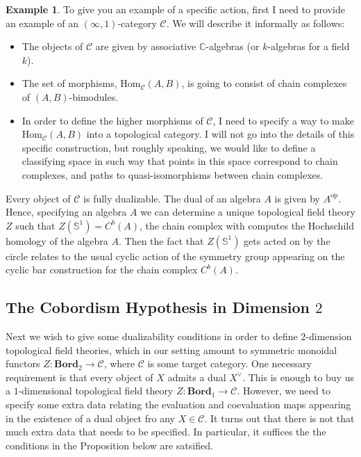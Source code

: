 \documentclass[a4paper,11pt]{article}
\newcommand{\Hom}{\mathrm{Hom}}
\newcommand{\ccal}{\mathcal{C}}
\theoremstyle{plain}
\theoremstyle{definition}
\newtheorem{ej}[thm]{Example}
\theoremstyle{remark}
\begin{document}
\begin{ej}
To give you an example of a specific action, first I need to provide an example of an $(\infty, 1)$-category $\ccal$. We will describe it informally as follows:
\begin{itemize}
    \item The objects of $\ccal$ are given by associative $\mathbb{C}$-algebras (or $k$-algebras for a field $k$). 
    \item The set of morphisms, $\Hom_{\ccal}(A, B)$, is going to consist of chain complexes of $(A,B)$-bimodules. 
    \item In order to define the higher morphisms of $\ccal$, I need to specify a way to make $\Hom_{\ccal}(A, B)$ into a topological category. I will not go into the details of this specific construction, but roughly speaking, we would like to define a classifying space in such way that points in this space correspond to chain complexes, and paths to quasi-isomorphisms between chain complexes.
\end{itemize}
Every object of $\ccal$ is fully dualizable. The dual of an algebra $A$ is given by $A^{\text{op}}$. Hence, specifying an algebra $A$ we can determine a unique topological field theory $Z$ such that $Z(\mathbb{S}^1) = C^b(A)$, the chain complex with computes the Hochschild homology of the algebra $A$. Then the fact that $Z(\mathbb{S}^1)$ gets acted on by the circle relates to the usual cyclic action of the symmetry group appearing on the cyclic bar construction for the chain complex $C^b(A)$.
\end{ej}


\subsection{The Cobordism Hypothesis in Dimension $2$}

Next we wish to give some dualizability conditions in order to define $2$-dimension topological field theories, which in our setting amount to symmetric monoidal functors $Z \colon \textbf{Bord}_2 \to \ccal$, where $\ccal$ is some target category. One necessary requirement is that every object of $X$ admits a dual $X^{\lor}$. This is enough to buy us a $1$-dimensional topological field theory $Z \colon \textbf{Bord}_1 \to \ccal$. However, we need to specify some extra data relating the evaluation and coevaluation maps appearing in the existence of a dual object fro any $X \in \ccal$. It turns out that there is not that much extra data that needs to be specified. In particular, it suffices the the conditions in the Proposition below are satsified. 
\end{document}

